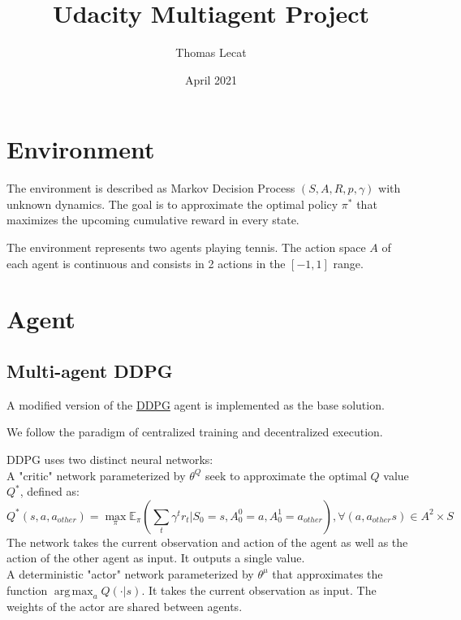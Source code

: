 \documentclass{article}
\title{Udacity Multiagent Project}
\author{Thomas Lecat}
\date{April 2021}
\DeclareMathOperator*{\argmax}{arg\,max}
\begin{document}
    \maketitle


    \section{Environment}\label{sec:environment}

    The environment is described as Markov Decision Process $(S, A, R, p, \gamma)$ with unknown dynamics.
    The goal is to approximate the optimal policy $\pi^*$ that maximizes the upcoming cumulative reward in every state.

    The environment represents two agents playing tennis.
    The action space $A$ of each agent is continuous and consists in 2 actions in the $[-1, 1]$ range.


    \section{Agent}\label{sec:agent}

    \subsection{Multi-agent DDPG}\label{subsec:ddpg}


    A modified version of the \href{https://arxiv.org/abs/1509.02971}{DDPG} agent is implemented as the base solution.

    We follow the paradigm of centralized training and decentralized execution.

    DDPG uses two distinct neural networks: \\

    A "critic" network parameterized by $\theta^Q$ seek to approximate the optimal $Q$ value $Q^*$, defined as:
    \[
        Q^*(s, a, a_{other}) = \max_{\pi} \mathbb{E}_{\pi} (\sum_{t} \gamma^t r_t | S_0=s, A^0_0=a, A^1_0=a_{other}),  \forall (a, a_{other} s) \in A^2 \times S
    \]
    The network takes the current observation and action of the agent as well as the action of the other agent as input. It outputs a single value.\\

    A deterministic "actor" network parameterized by $\theta^\mu$ that approximates the function $\argmax_a{Q(\cdot|s)}$.
    It takes the current observation as input.
    The weights of the actor are shared between agents.\\
\end{document}
